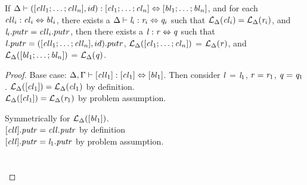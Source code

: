 \begin{lemma}
\label{lem:id-dnf}
If $\Delta \vdash ([\mathit{cll}_1 ; \ldots ; \mathit{cll}_n],id) : [\mathit{cl}_1 ; \ldots ; \mathit{cl}_n] \Leftrightarrow [\mathit{bl}_1 ; \ldots ; \mathit{bl}_n]$,
and for each $\mathit{cll}_i : \mathit{cl}_i \Leftrightarrow \mathit{bl}_i$,
there exists a $\Delta \vdash \mathit{l}_i : \mathit{r}_i \Leftrightarrow \mathit{q}_i$ such that
$\mathcal{L}_{\Delta}(\mathit{cl}_i)=\mathcal{L}_{\Delta}(\mathit{r}_i)$, and $\mathit{l}_i.putr = \mathit{cll}_i.putr$,
then there exists a $\mathit{l} : \mathit{r} \Leftrightarrow \mathit{q}$ such that $\mathit{l}.putr = ([\mathit{cll}_1 ; \ldots ; \mathit{cll}_n],id).putr$, $\mathcal{L}_{\Delta}([\mathit{cl}_1 ; \ldots ; \mathit{cl}_n])$ = $\mathcal{L}_{\Delta}(\mathit{r})$,
and $\mathcal{L}_{\Delta}([\mathit{bl}_1 ; \ldots ; \mathit{bl}_n])$ = $\mathcal{L}_{\Delta}(\mathit{q})$.
\begin{proof}
Base case: $\Delta, \Gamma \vdash [\mathit{cll}_1] : [\mathit{cl}_1] \Leftrightarrow [\mathit{bl}_1]$.  Then consider $\mathit{l}$ = $\mathit{l}_1$, $\mathit{r} = \mathit{r}_1$, $\mathit{q} = \mathit{q}_1$.
$\mathcal{L}_{\Delta}([\mathit{cl}_1]) = \mathcal{L}_{\Delta}(\mathit{cl}_1)$ by definition.\\
$\mathcal{L}_{\Delta}([\mathit{cl}_1]) = \mathcal{L}_{\Delta}(\mathit{r}_1)$ by problem assumption.

Symmetrically for $\mathcal{L}_{\Delta}([\mathit{bl}_1])$.\\
$[\mathit{cll}].\mathit{putr} = \mathit{cll}.\mathit{putr}$ by definition\\
$[\mathit{cll}].\mathit{putr} = \mathit{l}_1.\mathit{putr}$ by problem assumption.
\\\\\\




\end{proof}
\end{lemma}
